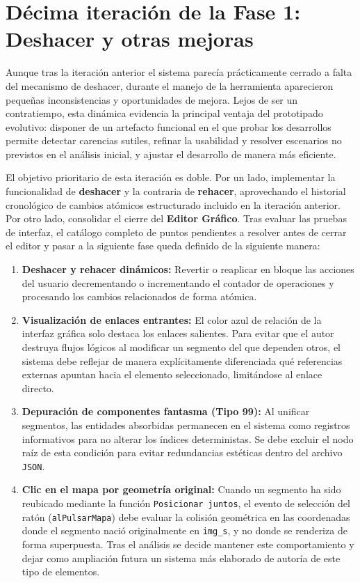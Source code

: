 \section{Décima iteración de la Fase 1: Deshacer y otras mejoras}
\label{sec:DeshacerYMejoras}

Aunque tras la iteración anterior el sistema parecía prácticamente cerrado a falta del mecanismo de deshacer, durante el manejo de la herramienta aparecieron pequeñas inconsistencias y oportunidades de mejora. Lejos de ser un contratiempo, esta dinámica evidencia la principal ventaja del prototipado evolutivo: disponer de un artefacto funcional en el que probar los desarrollos permite detectar carencias sutiles, refinar la usabilidad y resolver escenarios no previstos en el análisis inicial, y ajustar el desarrollo de manera más eficiente.

El objetivo prioritario de esta iteración es doble. Por un lado, implementar la funcionalidad de \textbf{deshacer} y la contraria de \textbf{rehacer}, aprovechando el historial cronológico de cambios atómicos estructurado incluido en la iteración anterior. Por otro lado, consolidar el cierre del \textbf{Editor Gráfico}. Tras evaluar las pruebas de interfaz, el catálogo completo de puntos pendientes a resolver antes de cerrar el editor y pasar a la siguiente fase queda definido de la siguiente manera:

\begin{enumerate}
	\item \textbf{Deshacer y rehacer dinámicos:} Revertir o reaplicar en bloque las acciones del usuario decrementando o incrementando el contador de operaciones y procesando los cambios relacionados de forma atómica.

	\item \textbf{Visualización de enlaces entrantes:} El color azul de relación de la interfaz gráfica solo destaca los enlaces salientes. Para evitar que el autor destruya flujos lógicos al modificar un segmento del que dependen otros, el sistema debe reflejar de manera explícitamente diferenciada qué referencias externas apuntan hacia el elemento seleccionado, limitándose al enlace directo.
		
	\item \textbf{Depuración de componentes fantasma (Tipo 99):} Al unificar segmentos, las entidades absorbidas permanecen en el sistema como registros informativos para no alterar los índices deterministas. Se debe excluir el nodo raíz de esta condición para evitar redundancias estéticas dentro del archivo \texttt{JSON}.
	
	\item \textbf{Clic en el mapa por geometría original:} Cuando un segmento ha sido reubicado mediante la función \texttt{Posicionar juntos}, el evento de selección del ratón (\texttt{alPulsarMapa}) debe evaluar la colisión geométrica en las coordenadas donde el segmento nació originalmente en \texttt{img\_s}, y no donde se renderiza de forma superpuesta. Tras el análisis se decide mantener este comportamiento y dejar como ampliación futura un sistema más elaborado de autoría de este tipo de elementos.

\end{enumerate}


